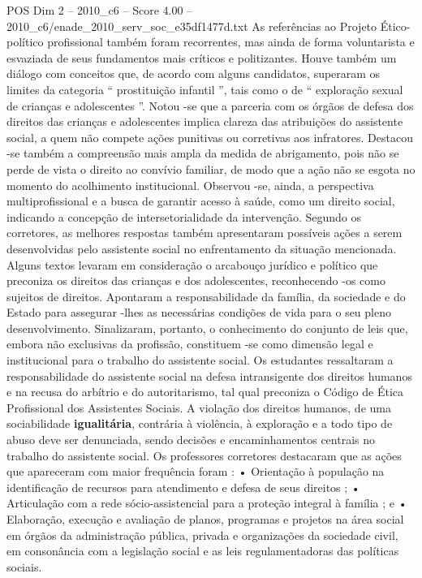 \begin{textsample}{POS Dim 2 – 2010\_c6 – Score 4.00 – 2010\_c6/enade\_2010\_serv\_soc\_e35df1477d.txt}
As referências ao Projeto Ético-político profissional também foram recorrentes, mas ainda de forma voluntarista e esvaziada de seus fundamentos mais críticos e politizantes.
Houve também um diálogo com conceitos que, de acordo com alguns candidatos, superaram os limites da categoria “ prostituição infantil ”, tais como o de “ exploração sexual de crianças e adolescentes ”.
Notou -se que a parceria com os órgãos de defesa dos direitos das crianças e adolescentes implica clareza das atribuições do assistente social, a quem não compete ações punitivas ou corretivas aos infratores.
Destacou -se também a compreensão mais ampla da medida de abrigamento, pois não se perde de vista o direito ao convívio familiar, de modo que a ação não se esgota no momento do acolhimento institucional.
Observou -se, ainda, a perspectiva multiprofissional e a busca de garantir acesso à saúde, como um direito social, indicando a concepção de intersetorialidade da intervenção.
Segundo os corretores, as melhores respostas também apresentaram possíveis ações a serem desenvolvidas pelo assistente social no enfrentamento da situação mencionada.
Alguns textos levaram em consideração o arcabouço jurídico e político que preconiza os direitos das crianças e dos adolescentes, reconhecendo -os como sujeitos de direitos.
Apontaram a responsabilidade da família, da sociedade e do Estado para assegurar -lhes as necessárias condições de vida para o seu pleno desenvolvimento.
Sinalizaram, portanto, o conhecimento do conjunto de leis que, embora não exclusivas da profissão, constituem -se como dimensão legal e institucional para o trabalho do assistente social.
Os estudantes ressaltaram a responsabilidade do assistente social na defesa intransigente dos direitos humanos e na recusa do arbítrio e do autoritarismo, tal qual preconiza o Código de Ética Profissional dos Assistentes Sociais.
A violação dos direitos humanos, de uma sociabilidade \textbf{igualitária}, contrária à violência, à exploração e a todo tipo de abuso deve ser denunciada, sendo decisões e encaminhamentos centrais no trabalho do assistente social.
Os professores corretores destacaram que as ações que apareceram com maior frequência foram : • Orientação à população na identificação de recursos para atendimento e defesa de seus direitos ; • Articulação com a rede sócio-assistencial para a proteção integral à família ; e • Elaboração, execução e avaliação de planos, programas e projetos na área social em órgãos da administração pública, privada e organizações da sociedade civil, em consonância com a legislação social e as leis regulamentadoras das políticas sociais.

\end{textsample}
